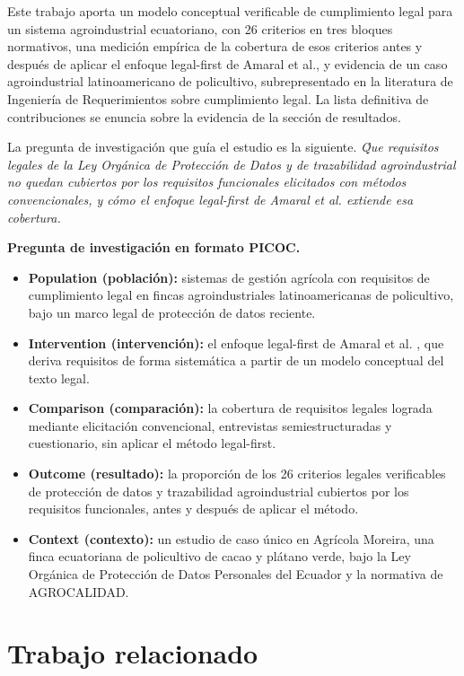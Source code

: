 \documentclass[pdflatex,sn-mathphys-num]{sn-jnl}
\begin{document}
Este trabajo aporta un modelo conceptual verificable de cumplimiento legal para un sistema agroindustrial ecuatoriano, con 26 criterios en tres bloques normativos, una medici\'on emp\'irica de la cobertura de esos criterios antes y despu\'es de aplicar el enfoque legal-first de Amaral et al., y evidencia de un caso agroindustrial latinoamericano de policultivo, subrepresentado en la literatura de Ingenier\'ia de Requerimientos sobre cumplimiento legal. La lista definitiva de contribuciones se enuncia sobre la evidencia de la secci\'on de resultados.

La pregunta de investigaci\'on que gu\'ia el estudio es la siguiente. \textit{\'Que requisitos legales de la Ley Org\'anica de Protecci\'on de Datos y de trazabilidad agroindustrial no quedan cubiertos por los requisitos funcionales elicitados con m\'etodos convencionales, y c\'omo el enfoque legal-first de Amaral et al. extiende esa cobertura.}

\medskip
\noindent\textbf{Pregunta de investigaci\'on en formato PICOC.}
\begin{itemize}
\item \textbf{Population (poblaci\'on):} sistemas de gesti\'on agr\'icola con requisitos de cumplimiento legal en fincas agroindustriales latinoamericanas de policultivo, bajo un marco legal de protecci\'on de datos reciente.
\item \textbf{Intervention (intervenci\'on):} el enfoque legal-first de Amaral et al. \cite{amaral2021}, que deriva requisitos de forma sistem\'atica a partir de un modelo conceptual del texto legal.
\item \textbf{Comparison (comparaci\'on):} la cobertura de requisitos legales lograda mediante elicitaci\'on convencional, entrevistas semiestructuradas y cuestionario, sin aplicar el m\'etodo legal-first.
\item \textbf{Outcome (resultado):} la proporci\'on de los 26 criterios legales verificables de protecci\'on de datos y trazabilidad agroindustrial cubiertos por los requisitos funcionales, antes y despu\'es de aplicar el m\'etodo.
\item \textbf{Context (contexto):} un estudio de caso \'unico en Agr\'icola Moreira, una finca ecuatoriana de policultivo de cacao y pl\'atano verde, bajo la Ley Org\'anica de Protecci\'on de Datos Personales del Ecuador y la normativa de AGROCALIDAD.
\end{itemize}

\section{Trabajo relacionado}\label{sec:trabajo-relacionado}
\end{document}
